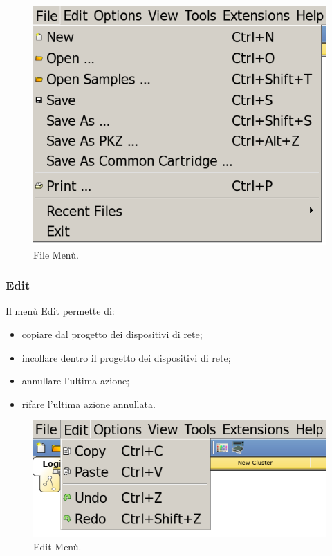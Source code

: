 \begin{figure}[htbp]
    \centerline{\includegraphics[scale=.3]{images/02.packet-tracer/file.png}}
    \caption{File Menù.}
\end{figure}

\subsubsection{Edit}
Il menù Edit permette di:

\begin{itemize}
    \item copiare dal progetto dei dispositivi di rete;
    \item incollare dentro il progetto dei dispositivi di rete;
    \item annullare l'ultima azione;
    \item rifare l'ultima azione annullata.
\end{itemize}

\begin{figure}[htbp]
    \centerline{\includegraphics[scale=.3]{images/02.packet-tracer/edit.png}}
    \caption{Edit Menù.}
\end{figure}

